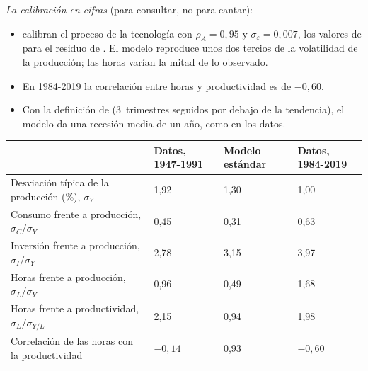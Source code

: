 \documentclass[11pt]{article}
\begin{document}
\begin{anotaciones}
\emph{La calibración en cifras} (para consultar, no para cantar):
\begin{itemize}
\item \textcite{HansenWright1992Labor} calibran el proceso de la tecnología con $\rho_A=0{,}95$ y $\sigma_\varepsilon=0{,}007$, los valores de \textcite{Prescott1986} para el residuo de . El modelo reproduce unos dos tercios de la volatilidad de la producción; las horas varían la mitad de lo observado.
\item En 1984-2019 la correlación entre horas y productividad es de $-0{,}60$\nocite{FRED2026CicloEEUU}.
\item Con la definición de \textcite{Rebelo2005Real} (3~trimestres seguidos por debajo de la tendencia), el modelo da una recesión media de un año, como en los datos.
\end{itemize}
\begin{tablacaja}
\centering
\caption{El ciclo de Estados Unidos y el modelo de ciclo real estándar}\label{tab:calibracion}
\small
\begin{tabular}{>{\raggedright\arraybackslash}m{5.0cm}>{\centering\arraybackslash}m{2.6cm}>{\centering\arraybackslash}m{2.3cm}>{\centering\arraybackslash}m{2.6cm}}
\toprule
\rowcolor{tceeazulpalido} & \textcolor{tceemorado}{\textbf{Datos, 1947-1991}} & \textcolor{tceeverde}{\textbf{Modelo estándar}} & \textcolor{tceeazul}{\textbf{Datos, 1984-2019}}\\
\midrule
Desviación típica de la producción (\%), $\sigma_Y$ & \textcolor{tceemorado}{1,92} & \textcolor{tceeverde}{1,30} & \textcolor{tceeazul}{1,00}\\
Consumo frente a producción, $\sigma_C/\sigma_Y$ & \textcolor{tceemorado}{0,45} & \textcolor{tceeverde}{0,31} & \textcolor{tceeazul}{0,63}\\
Inversión frente a producción, $\sigma_I/\sigma_Y$ & \textcolor{tceemorado}{2,78} & \textcolor{tceeverde}{3,15} & \textcolor{tceeazul}{3,97}\\
Horas frente a producción, $\sigma_L/\sigma_Y$ & \textcolor{tceemorado}{0,96} & \textcolor{tceeverde}{0,49} & \textcolor{tceeazul}{1,68}\\
Horas frente a productividad, $\sigma_L/\sigma_{Y/L}$ & \textcolor{tceemorado}{2,15} & \textcolor{tceeverde}{0,94} & \textcolor{tceeazul}{1,98}\\
Correlación de las horas con la productividad & \textcolor{tceemorado}{$-0{,}14$} & \textcolor{tceeverde}{0,93} & \textcolor{tceeazul}{$-0{,}60$}\\
\bottomrule
\end{tabular}
\end{tablacaja}
\end{anotaciones}
\end{document}
